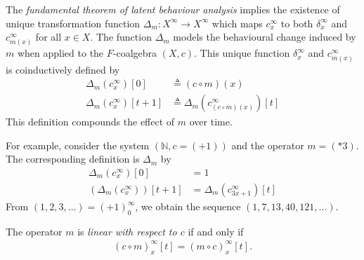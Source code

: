 \begin{definition}
The \emph{fundamental theorem of latent behaviour analysis} implies the existence of unique transformation function $\Delta_m\colon X^\infty\rightarrow X^\infty$ which maps $c_{x}^\infty$ to both $\delta_{x}^\infty$ and $c_{m(x)}^\infty$ for all $x\in X$. The function $\Delta_m$ models the behavioural change induced by $m$ when applied to the $F$-coalgebra $(X,c)$. This unique function $\delta_{x}^\infty$ and $c_{m(x)}^\infty$ is 
coinductively defined by 
\begin{align*}
    \Delta_{m}(c^\infty_x)[0]&\triangleq (c \circ m)(x)\\
    \Delta_{m}(c^\infty_x)[t+1]&\triangleq \Delta_{m}\left(c^\infty_{(c\circ m)(x)}\right)[t]
\end{align*}
This definition compounds the effect of $m$ over time.

For example, consider the system $(\mathbb{N},c=(+1))$ and the operator $m=(*3)$. The corresponding definition is $\Delta_{m}$ by
\begin{align*}
    \Delta_{m}(c^\infty_x)[0]&=1\\%
    (\Delta_{m}(c^\infty_x))[t+1]&=\Delta_{m}(c^\infty_{3x+1})[t]
\end{align*}
From $(1,2,3,\ldots)=(+1)^\infty_0$, we obtain the sequence $(1,7,13,40,121,\ldots)$. 

\begin{definition}
The operator $m$ is \emph{linear with respect to $c$} if and only if
\begin{align}
    (c\circ m)^\infty_x[t]= (m \circ c)^\infty_x[t].
\end{align}    
\end{definition}


\end{definition}
